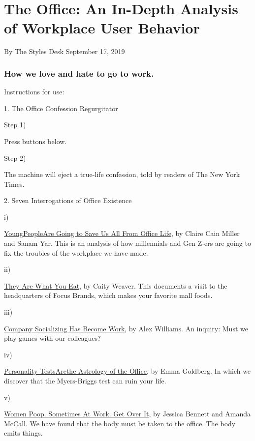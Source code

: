 \hypertarget{the-office-an-in-depth-analysis-of-workplace-user-behavior-1}{%
\section{The Office: An In-Depth Analysis of Workplace User
Behavior}\label{the-office-an-in-depth-analysis-of-workplace-user-behavior-1}}

By The Styles Desk September 17, 2019

\hypertarget{how-we-love-and-hate-to-go-to-work}{%
\subsubsection{How we love and hate to go to
work.}\label{how-we-love-and-hate-to-go-to-work}}

Instructions for use:

1. The Office Confession Regurgitator

Step 1)

Press buttons below.

Step 2)

The machine will eject a true-life confession, told by readers of The
New York Times.

2. Seven Interrogations of Office Existence

i)

\protect\hyperlink{elev1}{Young}\protect\hyperlink{elev1}{People}\protect\hyperlink{elev1}{}\protect\hyperlink{elev1}{Are
Going to Save Us All From Office Life}, by Claire Cain Miller and Sanam
Yar. This is an analysis of how millennials and Gen Z-ers are going to
fix the troubles of the workplace we have made.

ii)

\protect\hyperlink{elev2}{They Are What You Eat}, by Caity Weaver. This
documents a visit to the headquarters of Focus Brands, which makes your
favorite mall foods.

iii)

\protect\hyperlink{elev3}{Company Socializing Has Become Work}, by Alex
Williams. An inquiry: Must we play games with our colleagues?

iv)

\protect\hyperlink{elev4}{Personality
Tests}\protect\hyperlink{elev4}{Are}\protect\hyperlink{elev4}{the
Astrology of the Office}, by Emma Goldberg. In which we discover that
the Myers-Briggs test can ruin your life.

v)

\protect\hyperlink{elev5}{Women Poop. Sometimes At Work. Get Over It},
by Jessica Bennett and Amanda McCall. We have found that the body must
be taken to the office. The body emits things.

